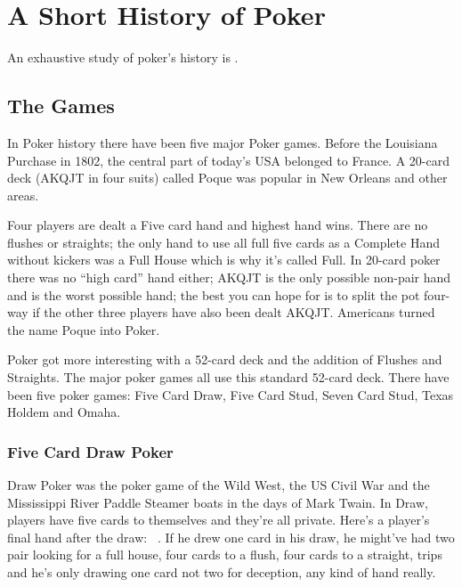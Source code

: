 \chapter{A Short History of Poker}

An exhaustive study of poker's history is \citet{McManus}.

\section{The Games}

In Poker history there have been five major Poker games.
Before the Louisiana Purchase in 1802, the central part of today's USA
belonged to France. A 20-card deck (AKQJT in four suits) called Poque
was popular in New Orleans and other areas.

Four players are dealt a Five card hand and highest hand wins. There
are no flushes or straights; the only hand to use all full five cards
as a Complete Hand without kickers was a Full House which is why it's
called Full. In 20-card poker there was no ``high card'' hand either;
AKQJT is the only possible non-pair hand and is the worst possible
hand; the best you can hope for is to split the pot four-way if the
other three players have also been dealt AKQJT. Americans turned the
name Poque into Poker.

Poker got more interesting with a 52-card deck and the addition of
Flushes and Straights. The major poker games all use this standard
52-card deck. There have been five poker games: Five Card Draw, Five
Card Stud, Seven Card Stud, Texas Holdem and Omaha.



\subsection{Five Card Draw Poker}

Draw Poker was the poker game of the Wild West, the US Civil War and
the Mississippi River Paddle Steamer boats in the days of Mark Twain.
In Draw, players have five cards to themselves and they're
all private. Here's a player's final hand after the draw:
\back\back\back\back\back\ . If he drew one card in his draw,
he might've had two pair looking for a full house, four cards to a
flush, four cards to a straight, trips and he's only drawing one card
not two for deception, any kind of hand really.

